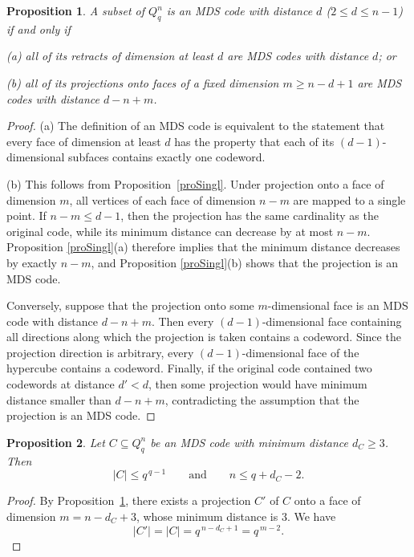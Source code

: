 \documentclass[11pt]{article}
\newtheorem{claim}{Proposition}[section]
\theoremstyle{definition}
\begin{document}
{{{\begin{claim}\label{mds99}
A subset of $Q_q^n$ is an {\rm MDS} code with distance $d$
($2\le d\le n-1$) if and only if

{\rm (a)} all of its retracts of dimension at least $d$ are
{\rm MDS} codes with distance $d$; or

{\rm (b)} all of its projections onto faces of a fixed dimension
$m\ge n-d+1$ are {\rm MDS} codes with distance $d-n+m$.
\end{claim}

\begin{proof}
(a) The definition of an MDS code is equivalent to the statement that
every face of dimension at least $d$ has the property that each of its
$(d-1)$-dimensional subfaces contains exactly one codeword.

(b) This follows from Proposition~\ref{proSingl}. Under projection
onto a face of dimension $m$, all vertices of each face of dimension
$n-m$ are mapped to a single point. If $n-m\le d-1$, then the
projection has the same cardinality as the original code, while its
minimum distance can decrease by at most $n-m$. Proposition
\ref{proSingl}(a) therefore implies that the minimum distance
decreases by exactly $n-m$, and Proposition
\ref{proSingl}(b) shows that the projection is an MDS code.

Conversely, suppose that the projection onto some
$m$-dimensional face is an MDS code with distance $d-n+m$.
Then every $(d-1)$-dimensional face containing all directions along
which the projection is taken contains a codeword. Since the
projection direction is arbitrary, every $(d-1)$-dimensional face of
the hypercube contains a codeword. Finally, if the original code
contained two codewords at distance $d'<d$, then some projection would
have minimum distance smaller than $d-n+m$, contradicting the
assumption that the projection is an MDS code.
\end{proof}

\begin{claim}\label{proAO2}
Let $C\subseteq Q_q^n$ be an {\rm MDS} code with minimum distance
$d_C\ge3$. Then
\[
|C|\le q^{\,q-1}
\qquad\text{and}\qquad
n\le q+d_C-2.
\]
\end{claim}

\begin{proof}
By Proposition~\ref{mds99}, there exists a projection $C'$ of $C$
onto a face of dimension
$m=n-d_C+3$,
whose minimum distance is $3$. We have
\[
|C'|=|C|=q^{\,n-d_C+1}=q^{\,m-2}.
\]


\end{proof}}}}
\end{document}
